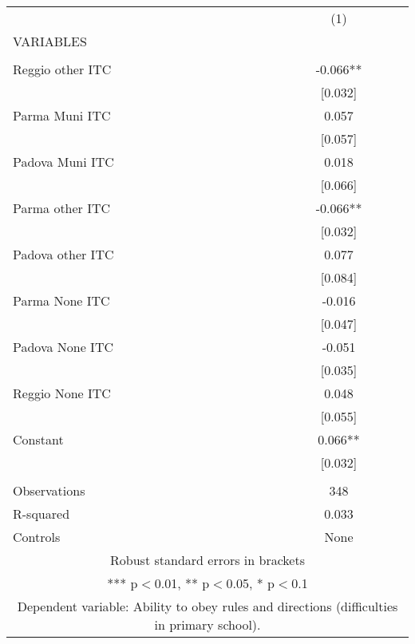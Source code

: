 \begin{tabular}{lc} \hline
 & (1) \\
VARIABLES &  \\ \hline
 &  \\
Reggio other ITC & -0.066** \\
 & [0.032] \\
Parma Muni ITC & 0.057 \\
 & [0.057] \\
Padova Muni ITC & 0.018 \\
 & [0.066] \\
Parma other ITC & -0.066** \\
 & [0.032] \\
Padova other ITC & 0.077 \\
 & [0.084] \\
Parma None ITC & -0.016 \\
 & [0.047] \\
Padova None ITC & -0.051 \\
 & [0.035] \\
Reggio None ITC & 0.048 \\
 & [0.055] \\
Constant & 0.066** \\
 & [0.032] \\
 &  \\
Observations & 348 \\
R-squared & 0.033 \\
 Controls & None \\ \hline
\multicolumn{2}{c}{ Robust standard errors in brackets} \\
\multicolumn{2}{c}{ *** p$<$0.01, ** p$<$0.05, * p$<$0.1} \\
\multicolumn{2}{c}{ Dependent variable: Ability to obey rules and directions (difficulties in primary school).} \\
\end{tabular}
